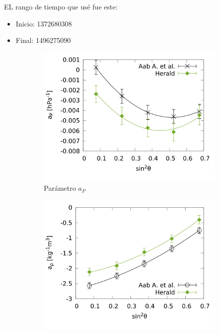 			EL rango de tiempo que usé fue este: 
			\begin{itemize}
				\item Inicio: 1372680308
				\item Final: 1496275090
			\end{itemize}
				\begin{figure}[H]
					\begin{subfigure}[b]{0.5\textwidth}
					\includegraphics[width=\linewidth]{../Anisotropia/params/ap_2017_above_1EeV.png}
					\caption{Parámetro $a_P$ }
					\label{fig:ap_2017_1EeV}
					\end{subfigure}%
					\hspace{\fill}
					\begin{subfigure}[b]{0.5\textwidth}
					\includegraphics[width=\linewidth]{../Anisotropia/params/arho_2017_above_1EeV.png}

\end{subfigure}
\end{figure}
